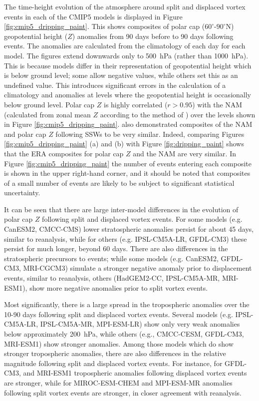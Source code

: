 The time-height evolution of the atmosphere around split and displaced vortex
events in each of the CMIP5 models is displayed in Figure
\ref{fig:cmip5_dripping_paint}. This shows composites of polar cap
($60^{\circ}$-$90^{\circ}$N) geopotential height ($Z$) anomalies from 90 days
before to 90 days following events. The anomalies are calculated from the
climatology of each day for each model. The figures extend downwards only to
500~hPa (rather than 1000~hPa). This is because models differ in their
representation of geopotential height which is below ground level; some allow
negative values, while others set this as an undefined value. This introduces
significant errors in the calculation of a climatology and anomalies at levels
where the geopotential height is occasionally below ground level. Polar cap $Z$
is highly correlated ($r>0.95$) with the NAM (calculated from zonal mean $Z$
according to the method of \citet{Baldwin2009}) over the levels shown in Figure
\ref{fig:cmip5_dripping_paint}. \citet{Kushner2010} also demonstrated composites
of the NAM and polar cap $Z$ following SSWs to be very similar. Indeed,
comparing Figures \ref{fig:cmip5_dripping_paint} (a) and (b) with Figure
\ref{fig:dripping_paint} shows that the ERA composites for polar cap $Z$ and the
NAM are very similar. In Figure \ref{fig:cmip5_dripping_paint} the number of
events entering each composite is shown in the upper right-hand corner, and it
should be noted that composites of a small number of events are likely to be
subject to significant statistical uncertainty.

It can be seen that there are large inter-model differences in the evolution of
polar cap $Z$ following split and displaced vortex events. For some models
(e.g. CanESM2, CMCC-CMS) lower stratospheric anomalies persist for about 45
days, similar to reanalysis, while for others (e.g. IPSL-CM5A-LR, GFDL-CM3)
these persist for much longer, beyond 60 days. There are also differences in the
stratospheric precursors to events; while some models (e.g. CanESM2, GFDL-CM3,
MRI-CGCM3) simulate a stronger negative anomaly prior to displacement events,
similar to reanalysis, others (HadGEM2-CC, IPSL-CM5A-MR, MRI-ESM1), show more
negative anomalies prior to split vortex events. 

Most significantly, there is a large spread in the tropospheric anomalies over
the 10-90 days following split and displaced vortex events. Several models
(e.g. IPSL-CM5A-LR, IPSL-CM5A-MR, MPI-ESM-LR) show only very weak anomalies
below approximately 200~hPa, while others (e.g., CMCC-CESM, GFDL-CM3, MRI-ESM1)
show stronger anomalies. Among those models which do show stronger tropospheric
anomalies, there are also differences in the relative magnitude following split
and displaced vortex events. For instance, for GFDL-CM3, and MRI-ESM1
tropospheric anomalies following displaced vortex events are stronger, while for
MIROC-ESM-CHEM and MPI-ESM-MR anomalies following split vortex events are
stronger, in closer agreement with reanalysis. 

